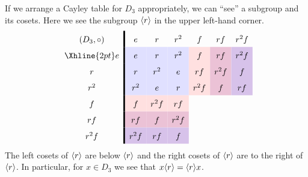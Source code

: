 \documentclass{ximera}
\begin{document}
\begin{example}
  If we arrange a Cayley table for $D_3$ appropriately, we can ``see''
  a subgroup and its cosets. Here we see the subgroup $\langle r\rangle$ in the
  upper left-hand corner.
    \[
    \renewcommand{\arraystretch}{1.6}
    \begin{array}{c!{\vline width 2pt}cccccc}
      (D_3,\circ)& e                              & r                              & r^2                            & f                             & r f                                   & r^2 f  \\  \Xhline{2pt}
      e          & e\cellcolor{blue!12!white}     & r\cellcolor{blue!12!white}    & r^2\cellcolor{blue!12!white}   & f \cellcolor{red!12!white}    & r f \cellcolor{blue!33!red!24!white}   & r^2f \cellcolor{blue!66!red!24!white} \\  
      r                                  & r\cellcolor{blue!12!white}    & r^2\cellcolor{blue!12!white}   & e \cellcolor{blue!12!white}    & rf\cellcolor{red!12!white} & r^2f \cellcolor{blue!33!red!24!white}    & f \cellcolor{blue!66!red!24!white}   \\  
      r^2                                 & r^2\cellcolor{blue!12!white}   & e\cellcolor{blue!12!white}     & r\cellcolor{blue!12!white}    & r^2 f \cellcolor{red!12!white}   & f \cellcolor{blue!33!red!24!white} & rf \cellcolor{blue!66!red!24!white}   \\  
      f        & f \cellcolor{red!12!white}    & r^2f \cellcolor{red!12!white}   & r f \cellcolor{red!12!white} &     &   &   \\  
      r f       & rf \cellcolor{blue!33!red!24!white}   & f \cellcolor{blue!33!red!24!white} & r^2f \cellcolor{blue!33!red!24!white}   &    &      &     \\  
      r^2 f       & r^2 f\cellcolor{blue!66!red!24!white} & rf \cellcolor{blue!66!red!24!white}    & f \cellcolor{blue!66!red!24!white}  &     &     &      \\  
    \end{array}
    \]
    The left cosets of $\langle r\rangle$ are below $\langle r\rangle$ and the right cosets
    of $\langle r\rangle$ are to the right of $\langle r\rangle$. In particular, for $x\in
    D_3$ we see that $x\langle r\rangle = \langle r\rangle x$.
\end{example}
\end{document}
